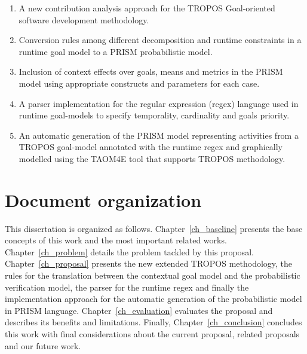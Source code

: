 \begin{enumerate}

\item A new contribution analysis approach for the TROPOS Goal-oriented software development methodology.

\item Conversion rules among different decomposition and runtime constraints in a runtime goal model to a PRISM probabilistic model.

\item Inclusion of context effects over goals, means and metrics in the PRISM model using appropriate constructs and parameters for each case.

\item A parser implementation for the regular expression (regex) language used in runtime goal-models to specify temporality, cardinality and goals priority. 

\item An automatic generation of the PRISM model representing activities from a TROPOS goal-model annotated with the runtime regex and graphically modelled using the TAOM4E tool that supports TROPOS methodology.

\end{enumerate}

\section{Document organization}

This dissertation is organized as follows. Chapter~\ref{ch_baseline} presents the base concepts of this work and the most important related works. Chapter~\ref{ch_problem} details the problem tackled by this proposal. Chapter~\ref{ch_proposal} presents the new extended TROPOS methodology, the rules for the translation between the contextual goal model and the probabilistic verification model, the parser for the runtime regex and finally the implementation approach for the automatic generation of the probabilistic model in PRISM language. Chapter~\ref{ch_evaluation} evaluates the proposal and describes its benefits and limitations. Finally, Chapter~\ref{ch_conclusion} concludes this work with final considerations about the current proposal, related proposals and our future work.